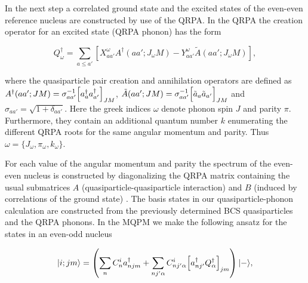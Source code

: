 In the next step a correlated ground state and the
excited states of the even-even reference nucleus are constructed
by use of the QRPA. In the QRPA the creation operator for an excited
state (QRPA phonon) has the form

\begin{equation}
      Q^{\dagger}_{\omega} = \sum_{a\le a'} \left\lbrack X^{\omega}_{aa'}
      A^{\dagger}(aa';J_{\omega}M) -
      Y^{\omega}_{aa'} {\tilde{A}}(aa';J_{\omega}M) \right\rbrack,
\end{equation}

where the quasiparticle pair creation and annihilation operators
are defined as
$A^{\dagger}(aa';JM)=\sigma^{-1}_{aa'}\Bigl\lbrack a^{\dagger}_{a}
a^{\dagger}_{a'} 
\Bigr\rbrack_{JM}$,  
${\tilde{A}}(aa';JM)=\sigma^{-1}_{aa'}\Bigl\lbrack \tilde{a}_{a}\tilde{a}_{a'} 
\Bigr\rbrack_{JM}$ and $\sigma_{aa'}=\sqrt{1+\delta_{aa'}}$.
Here the greek indices $\omega$ denote phonon spin $J$ and
parity $\pi$. Furthermore, they contain
an additional quantum number $k$ enumerating the different QRPA
roots for the same angular momentum and parity. Thus
$\omega=\lbrace J_{\omega},\pi_{\omega},k_{\omega} \rbrace$.

For each value of the angular momentum and parity the spectrum
of the even-even nucleus is constructed by diagonalizing the QRPA
matrix containing the usual submatrices $A$ (quasiparticle-quasiparticle
interaction) and $B$ (induced by correlations of the ground state)
\cite{RIN80}. The basis states in our quasiparticle-phonon calculation are
constructed from the previously determined BCS quasiparticles and
the QRPA phonons. In the MQPM we make the following ansatz for the 
states in an even-odd nucleus

\begin{equation}
      \vert i;jm\rangle = 
      \left(\sum_n C^i_n a^{\dagger}_{njm} + \sum_{nj'\alpha}
      C^i_{nj'\alpha} \Bigl\lbrack a^{\dagger}_{nj'} Q^{\dagger}_\alpha 
      \Bigr\rbrack_{jm} \right)
      \vert -\rangle,
\end{equation}

